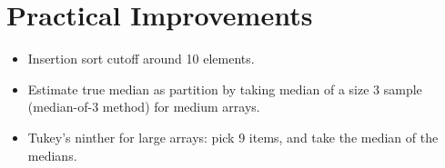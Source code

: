 \documentclass[11pt]{article}
\begin{document}
\section{Practical Improvements}
	\begin{itemize}
		\item Insertion sort cutoff around 10 elements.
		\item Estimate true median as partition by taking median of a size 3 sample (median-of-3 method) for medium arrays.
		\item Tukey's ninther for large arrays: pick 9 items, and take the median of the medians.
	\end{itemize}

	\def\enotesize{\normalsize}
	\theendnotes
\end{document}
